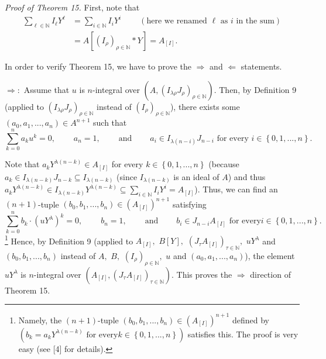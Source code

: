 \documentclass[12pt,final,notitlepage,onecolumn]{article}%
\begin{document}
\textit{Proof of Theorem 15.} First, note that%
\begin{align*}
\sum\limits_{\ell\in\mathbb{N}}I_{\ell}Y^{\ell}  &  =\sum\limits_{i\in
\mathbb{N}}I_{i}Y^{i}\ \ \ \ \ \ \ \ \ \ \left(  \text{here we renamed }%
\ell\text{ as }i\text{ in the sum}\right) \\
&  =A\left[  \left(  I_{\rho}\right)  _{\rho\in\mathbb{N}}\ast Y\right]
=A_{\left[  I\right]  }.
\end{align*}


In order to verify Theorem 15, we have to prove the $\Longrightarrow$ and
$\Longleftarrow$ statements.

$\Longrightarrow:$ Assume that $u$ is $n$-integral over $\left(  A,\left(
I_{\lambda\rho}J_{\rho}\right)  _{\rho\in\mathbb{N}}\right)  $. Then, by
Definition 9 (applied to $\left(  I_{\lambda\rho}J_{\rho}\right)  _{\rho
\in\mathbb{N}}$ instead of $\left(  I_{\rho}\right)  _{\rho\in\mathbb{N}}$),
there exists some $\left(  a_{0},a_{1},...,a_{n}\right)  \in A^{n+1}$ such
that%
\[
\sum\limits_{k=0}^{n}a_{k}u^{k}=0,\ \ \ \ \ \ \ \ \ \ a_{n}%
=1,\ \ \ \ \ \ \ \ \ \ \text{and}\ \ \ \ \ \ \ \ \ \ a_{i}\in I_{\lambda
\left(  n-i\right)  }J_{n-i}\text{ for every }i\in\left\{  0,1,...,n\right\}
.
\]


Note that $a_{k}Y^{\lambda\left(  n-k\right)  }\in A_{\left[  I\right]  }$ for
every $k\in\left\{  0,1,...,n\right\}  $ (because $a_{k}\in I_{\lambda\left(
n-k\right)  }J_{n-k}\subseteq I_{\lambda\left(  n-k\right)  }$ (since
$I_{\lambda\left(  n-k\right)  }$ is an ideal of $A$) and thus $a_{k}%
Y^{\lambda\left(  n-k\right)  }\in I_{\lambda\left(  n-k\right)  }%
Y^{\lambda\left(  n-k\right)  }\subseteq\sum\limits_{i\in\mathbb{N}}I_{i}%
Y^{i}=A_{\left[  I\right]  }$). Thus, we can find an $\left(  n+1\right)
$-tuple $\left(  b_{0},b_{1},...,b_{n}\right)  \in\left(  A_{\left[  I\right]
}\right)  ^{n+1}$ satisfying%
\[
\sum\limits_{k=0}^{n}b_{k}\cdot\left(  uY^{\lambda}\right)  ^{k}%
=0,\ \ \ \ \ \ \ \ \ \ b_{n}=1,\ \ \ \ \ \ \ \ \ \ \text{and}%
\ \ \ \ \ \ \ \ \ \ b_{i}\in J_{n-i}A_{\left[  I\right]  }\text{ for every
}i\in\left\{  0,1,...,n\right\}  .
\]
\footnote{Namely, the $\left(  n+1\right)  $-tuple $\left(  b_{0}%
,b_{1},...,b_{n}\right)  \in\left(  A_{\left[  I\right]  }\right)  ^{n+1}$
defined by $\left(  b_{k}=a_{k}Y^{\lambda\left(  n-k\right)  }\text{ for every
}k\in\left\{  0,1,...,n\right\}  \right)  $ satisfies this. The proof is very
easy (see [4] for details).} Hence, by Definition 9 (applied to $A_{\left[
I\right]  },$ $B\left[  Y\right]  ,$ $\left(  J_{\tau}A_{\left[  I\right]
}\right)  _{\tau\in\mathbb{N}},$ $uY^{\lambda}$ and $\left(  b_{0}%
,b_{1},...,b_{n}\right)  $ instead of $A,$ $B,$ $\left(  I_{\rho}\right)
_{\rho\in\mathbb{N}},$ $u$ and $\left(  a_{0},a_{1},...,a_{n}\right)  $), the
element $uY^{\lambda}$ is $n$-integral over $\left(  A_{\left[  I\right]
},\left(  J_{\tau}A_{\left[  I\right]  }\right)  _{\tau\in\mathbb{N}}\right)
$. This proves the $\Longrightarrow$ direction of Theorem 15.
\end{document}
